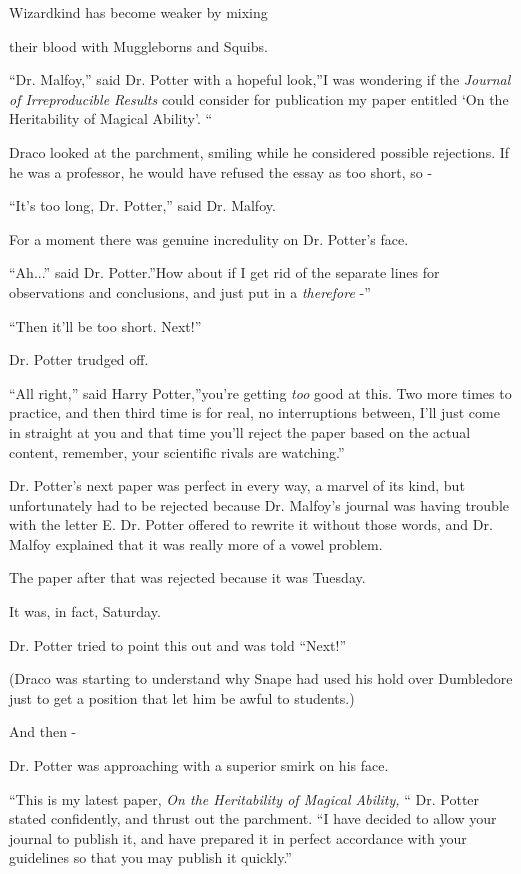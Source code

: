 Wizardkind has become weaker by mixing

their blood with Muggleborns and Squibs.

``Dr. Malfoy,'' said Dr. Potter with a hopeful look,''I was wondering if
the \emph{Journal of Irreproducible Results} could consider for
publication my paper entitled `On the Heritability of Magical Ability'.
``

Draco looked at the parchment, smiling while he considered possible
rejections. If he was a professor, he would have refused the essay as
too short, so -

``It's too long, Dr. Potter,'' said Dr. Malfoy.

For a moment there was genuine incredulity on Dr. Potter's face.

``Ah...'' said Dr. Potter.''How about if I get rid of the separate
lines for observations and conclusions, and just put in a
\emph{therefore} -''

``Then it'll be too short. Next!''

Dr. Potter trudged off.

``All right,'' said Harry Potter,''you're getting \emph{too} good at
this. Two more times to practice, and then third time is for real, no
interruptions between, I'll just come in straight at you and that time
you'll reject the paper based on the actual content, remember, your
scientific rivals are watching.''

Dr. Potter's next paper was perfect in every way, a marvel of its kind,
but unfortunately had to be rejected because Dr. Malfoy's journal was
having trouble with the letter E. Dr. Potter offered to rewrite it
without those words, and Dr. Malfoy explained that it was really more of
a vowel problem.

The paper after that was rejected because it was Tuesday.

It was, in fact, Saturday.

Dr. Potter tried to point this out and was told ``Next!''

(Draco was starting to understand why Snape had used his hold over
Dumbledore just to get a position that let him be awful to students.)

And then -

Dr. Potter was approaching with a superior smirk on his face.

``This is my latest paper, \emph{On the Heritability of Magical Ability,}
`` Dr. Potter stated confidently, and thrust out the parchment. ``I have
decided to allow your journal to publish it, and have prepared it in
perfect accordance with your guidelines so that you may publish it
quickly.''


